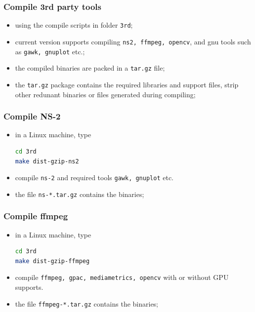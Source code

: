 \documentclass{beamer}
\theoremstyle{definition}
\theoremstyle{remark}
\begin{document}
\begin{frame}[fragile]
  \frametitle<presentation>{Compile 3rd party tools}

    \begin{itemize}
      \item using the compile scripts in folder \texttt{3rd};
      \item current version supports compiling \texttt{ns2, ffmpeg, opencv}, and gnu tools such as \texttt{gawk, gnuplot} etc.;
      \item the compiled binaries are packed in a \texttt{tar.gz} file;
      \item the \texttt{tar.gz} package contains the required libraries and support files, strip other redunant binaries or files generated during compiling;
    \end{itemize}

\end{frame}




\begin{frame}[fragile]
  \frametitle<presentation>{Compile NS-2}

    \begin{itemize}
      \item in a Linux machine, type
\begin{lstlisting}[language=bash]
cd 3rd
make dist-gzip-ns2
\end{lstlisting}
      \item compile \texttt{ns-2} and required tools \texttt{gawk, gnuplot} etc.
      \item the file \texttt{ns-*.tar.gz} contains the binaries;
    \end{itemize}

\end{frame}


\begin{frame}[fragile]
  \frametitle<presentation>{Compile ffmpeg}

    \begin{itemize}
      \item in a Linux machine, type
\begin{lstlisting}[language=bash]
cd 3rd
make dist-gzip-ffmpeg
\end{lstlisting}
      \item compile \texttt{ffmpeg, gpac, mediametrics, opencv} with or without GPU supports.
      \item the file \texttt{ffmpeg-*.tar.gz} contains the binaries;
    \end{itemize}

\end{frame}
\end{document}
